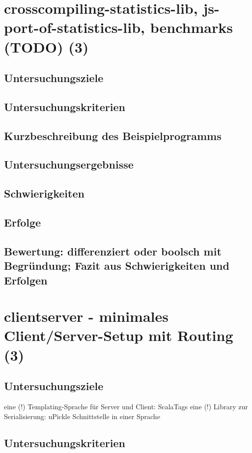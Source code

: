 \documentclass[a4paper, 12pt, hidelinks, listof=totoc, listoftables=totoc, bibliography=totoc]{scrreprt}
\begin{document}
\section{crosscompiling-statistics-lib, js-port-of-statistics-lib, benchmarks (TODO) (3)}

\subsection{Untersuchungsziele}
\subsection{Untersuchungskriterien}
\subsection{Kurzbeschreibung des Beispielprogramms}
\subsection{Untersuchungsergebnisse}
\subsection{Schwierigkeiten}
\subsection{Erfolge}
\subsection{Bewertung: differenziert oder boolsch mit Begründung; Fazit aus Schwierigkeiten und Erfolgen}

\section{clientserver - minimales Client/Server-Setup mit Routing (3)}

\subsection{Untersuchungsziele}
eine (!) Templating-Sprache für Server und Client: ScalaTags \cite{haoyi.HOS}
eine (!) Library zur Serialisierung: uPickle \cite{haoyi.HOS}
Schnittstelle in einer Sprache

\subsection{Untersuchungskriterien}
\end{document}
